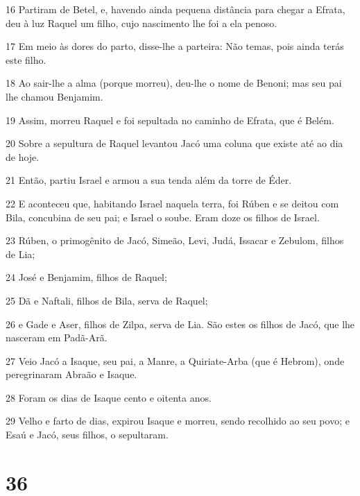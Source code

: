 \par 16 Partiram de Betel, e, havendo ainda pequena distância para chegar a Efrata, deu à luz Raquel um filho, cujo nascimento lhe foi a ela penoso.
\par 17 Em meio às dores do parto, disse-lhe a parteira: Não temas, pois ainda terás este filho.
\par 18 Ao sair-lhe a alma (porque morreu), deu-lhe o nome de Benoni; mas seu pai lhe chamou Benjamim.
\par 19 Assim, morreu Raquel e foi sepultada no caminho de Efrata, que é Belém.
\par 20 Sobre a sepultura de Raquel levantou Jacó uma coluna que existe até ao dia de hoje.
\par 21 Então, partiu Israel e armou a sua tenda além da torre de Éder.
\par 22 E aconteceu que, habitando Israel naquela terra, foi Rúben e se deitou com Bila, concubina de seu pai; e Israel o soube. Eram doze os filhos de Israel.
\par 23 Rúben, o primogênito de Jacó, Simeão, Levi, Judá, Issacar e Zebulom, filhos de Lia;
\par 24 José e Benjamim, filhos de Raquel;
\par 25 Dã e Naftali, filhos de Bila, serva de Raquel;
\par 26 e Gade e Aser, filhos de Zilpa, serva de Lia. São estes os filhos de Jacó, que lhe nasceram em Padã-Arã.
\par 27 Veio Jacó a Isaque, seu pai, a Manre, a Quiriate-Arba (que é Hebrom), onde peregrinaram Abraão e Isaque.
\par 28 Foram os dias de Isaque cento e oitenta anos.
\par 29 Velho e farto de dias, expirou Isaque e morreu, sendo recolhido ao seu povo; e Esaú e Jacó, seus filhos, o sepultaram.

\chapter{36}

